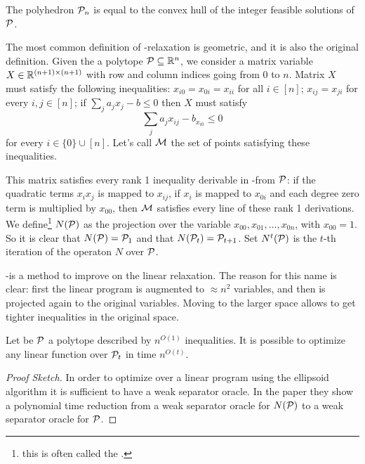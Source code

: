 \documentclass[a4paper,twoside,justified]{tufte-handout}
\begin{document}
\begin{theorem}
  The polyhedron $ \mathcal{P}_{n} $ is equal to the convex hull of the
  integer feasible solutions of $ \mathcal{P} $.
\end{theorem}

The most common definition of \Lovasz-\Schrijver relaxation is
geometric, and it is also the original definition. Given the a
polytope $ \mathcal{P} \subseteq  \mathbb{R}^{n} $, we consider a
matrix variable $X \in \mathbb{R}^{(n+1)\times(n+1)} $ with row and
column indices going from $ 0 $ to $ n $. Matrix $X$ must satisfy the
following inequalities: $ x_{i0} = x_{0i} = x_{ii} $ for all $ i \in
[n] $; $ x_{ij}=x_{ji} $ for every $ i,j \in [n]$; if $
\sum_{j}a_{j}x_{j} - b \leq 0 $ then $ X $ must satisfy
\begin{equation*}
  \sum_{j}a_{j}x_{ij} - b_{x_{i0}} \leq 0
\end{equation*}
for every $ i \in \{0\}\cup[n]$. Let's call $ \mathcal{M} $ the set of
points satisfying these inequalities.

This matrix satisfies every rank 1 inequality derivable in
\Lovasz-\Schrijver from $\mathcal{P}$: if the quadratic terms $ x_{i}x_{j}
$ is mapped to $ x_{ij} $, if $ x_{i} $ is mapped to $ x_{0i} $ and
each degree zero term is multiplied by $ x_{00} $, then $ \mathcal{M} $
satisfies every line of these rank 1 derivations.
%
We
define\footnote{this is often called the
  .}  $ N(\mathcal{P}) $ as the
projection over the variable $ x_{00},x_{01},\ldots, x_{0n} $, with $
x_{00}=1 $. So it is clear that $ N(\mathcal{P})=\mathcal{P}_{1} $ and that $
N(\mathcal{P}_{t})=\mathcal{P}_{t+1} $. Set $ N^{t}(\mathcal{P}) $ is the $ t
$-th iteration of the operaton $ N $ over $ \mathcal{P} $.

\Lovasz-\Schrijver is a  method to
improve on the linear relaxation. The reason for this name is clear:
first the linear program is augmented to $ \approx n^{2} $ variables,
and then is projected again to the original variables. Moving to the
larger space allows to get tighter inequalities in the original space.

\pagebreak

\begin{theorem}\cite{lovasz1991cones}
  Let be $\mathcal{P}$ a polytope described by $ n^{O(1)} $
  inequalities. It is possible to optimize any linear function over $
  \mathcal{P}_{t} $ in time $ n^{O(t)} $.
\end{theorem}
\begin{proof}[Proof Sketch]
  In order to optimize over a linear program using the ellipsoid
  algorithm it is sufficient to have a weak separator oracle. In the
  paper they show a polynomial time reduction from a weak separator
  oracle for $ N(\mathcal{P}) $ to a weak separator oracle for $\mathcal{P}$.
\end{proof}
\end{document}
